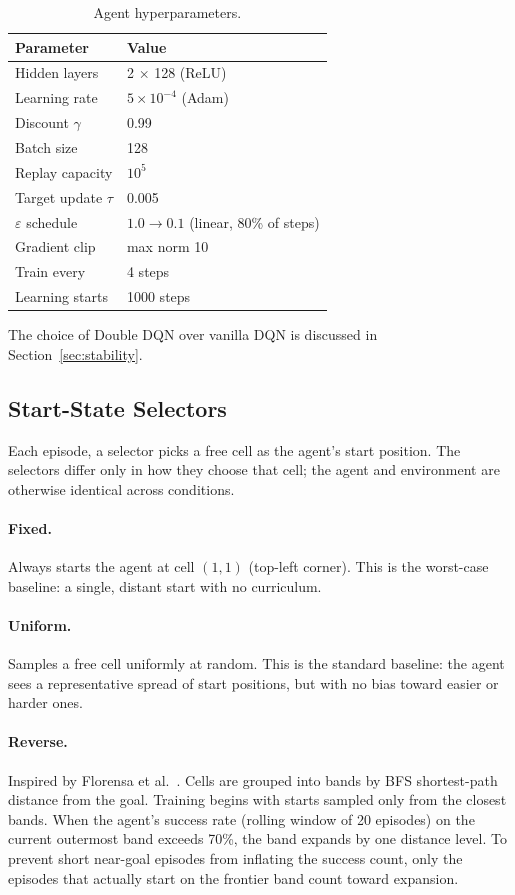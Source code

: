 \documentclass{article}
\begin{document}
\begin{table}[h]
\caption{Agent hyperparameters.}
\label{tab:hyperparams}
\centering
\begin{tabular}{ll}
\toprule
Parameter & Value \\
\midrule
Hidden layers      & 2 $\times$ 128 (ReLU) \\
Learning rate      & $5 \times 10^{-4}$ (Adam) \\
Discount $\gamma$  & 0.99 \\
Batch size         & 128 \\
Replay capacity    & $10^5$ \\
Target update $\tau$ & 0.005 \\
$\varepsilon$ schedule & $1.0 \to 0.1$ (linear, 80\% of steps) \\
Gradient clip      & max norm 10 \\
Train every        & 4 steps \\
Learning starts    & 1000 steps \\
\bottomrule
\end{tabular}
\end{table}

The choice of Double DQN over vanilla DQN is discussed in
Section~\ref{sec:stability}.

\subsection{Start-State Selectors}
Each episode, a selector picks a free cell as the agent's start position. The selectors differ only in how they choose that cell; the agent and environment are otherwise identical across conditions.

\paragraph{Fixed.} Always starts the agent at cell $(1, 1)$ (top-left
corner). This is the worst-case baseline: a single, distant start with no curriculum.

\paragraph{Uniform.} Samples a free cell uniformly at random. This is the standard baseline: the agent sees a representative spread of start
positions, but with no bias toward easier or harder ones.

\paragraph{Reverse.} Inspired by Florensa et
al.~\cite{florensa2017reverse}. Cells are grouped into bands by BFS
shortest-path distance from the goal. Training begins with starts sampled only from the closest bands. When the agent's success rate (rolling window of 20 episodes) on the current outermost band exceeds 70\%, the band expands by one distance level. To prevent short near-goal episodes from inflating the success count, only the episodes that actually start on the frontier band count toward expansion.
\end{document}
